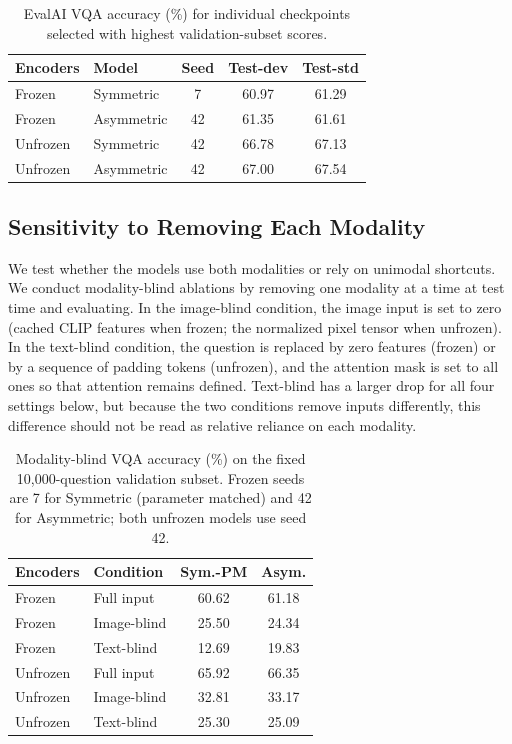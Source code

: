 \documentclass[conference]{IEEEtran}
\begin{document}
\begin{table}[t]
\centering
\caption{EvalAI VQA accuracy (\%) for individual checkpoints selected with highest validation-subset scores.}
\label{tab:vqa_test}
\setlength{\tabcolsep}{3pt}
\renewcommand{\arraystretch}{1.05}
\begin{tabular}{llccc}
\hline
\textbf{Encoders} & \textbf{Model} & \textbf{Seed} & \textbf{Test-dev} & \textbf{Test-std}\\
\hline
Frozen & Symmetric& 7 & 60.97 & 61.29\\
Frozen & Asymmetric& 42 & 61.35& 61.61\\
Unfrozen & Symmetric& 42 & 66.78 & 67.13\\
Unfrozen & Asymmetric& 42 & 67.00& 67.54\\
\hline
\end{tabular}
\end{table}

\subsection{Sensitivity to Removing Each Modality}

We test whether the models use both modalities or rely on unimodal shortcuts. We conduct modality-blind ablations by removing one modality at a time at test time and evaluating. In the image-blind condition, the image input is set to zero (cached CLIP features when frozen; the normalized pixel tensor when unfrozen). In the text-blind condition, the question is replaced by zero features (frozen) or by a sequence of padding tokens (unfrozen), and the attention mask is set to all ones so that attention remains defined. Text-blind has a larger drop for all four settings below, but because the two conditions remove inputs differently, this difference should not be read as relative reliance on each modality.


\begin{table}[t]
\centering
\small
\caption{Modality-blind VQA accuracy (\%) on the fixed 10,000-question validation subset. Frozen seeds are 7 for Symmetric (parameter matched) and 42 for Asymmetric; both unfrozen models use seed 42.}
\label{tab:vqa_modality_ablation}
\setlength{\tabcolsep}{3pt}
\renewcommand{\arraystretch}{1.05}
\begin{tabular}{llcc}
\hline
\textbf{Encoders} & \textbf{Condition} & \textbf{Sym.-PM} & \textbf{Asym.}\\
\hline
Frozen & Full input & 60.62 & 61.18\\
Frozen & Image-blind & 25.50 & 24.34\\
Frozen & Text-blind & 12.69 & 19.83\\
\hline
Unfrozen & Full input & 65.92 & 66.35\\
Unfrozen & Image-blind & 32.81 & 33.17\\
Unfrozen & Text-blind & 25.30 & 25.09\\
\hline
\end{tabular}
\end{table}
\end{document}

